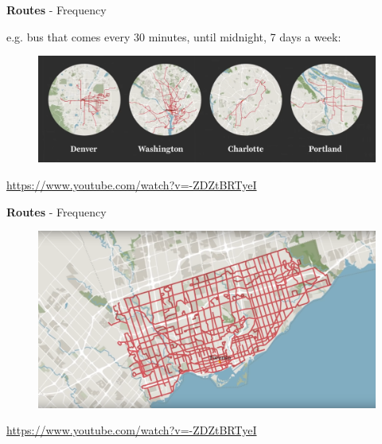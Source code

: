 \documentclass[aspectratio=169]{beamer}
\begin{document}
\begin{frame}
	
	\textbf{Routes} - Frequency
	
	\vspace{2mm}
	
	e.g. bus that comes every 30 minutes, until midnight, 7 days a week:
	
	\begin{figure}
		\centering
		\includegraphics[width=1\linewidth]{images/frequency_usa.png}
	\end{figure}

	\tiny\url{https://www.youtube.com/watch?v=-ZDZtBRTyeI}
	
\end{frame}


\begin{frame}
	
	\textbf{Routes} - Frequency
	
	\begin{figure}
		\centering
		\includegraphics[width=1\linewidth]{images/toronto_frequency.png}
	\end{figure}

	\tiny\url{https://www.youtube.com/watch?v=-ZDZtBRTyeI}
	
\end{frame}
\end{document}
